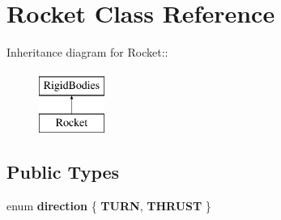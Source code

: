\hypertarget{classRocket}{
\section{Rocket Class Reference}
\label{classRocket}
}
Inheritance diagram for Rocket::\begin{figure}[H]
\begin{center}
\leavevmode
\includegraphics[height=2cm]{classRocket}
\end{center}
\end{figure}
\subsection*{Public Types}
\begin{DoxyCompactItemize}
\item 
enum {\bfseries direction} \{ {\bfseries TURN}, 
{\bfseries THRUST}
 \}
\end{DoxyCompactItemize}
